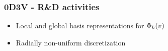 \documentclass[mathserif, aspectratio=169]{beamer}
\newcommand{\of}[1]{\mleft( #1 \mright)}
\begin{document}
\begin{frame}
	\frametitle{0D3V - R\&D activities}
	\begin{itemize}
		\item Local and global basis representations for $\Phi_k\of{v}$
		
		\item Radially non-uniform discretization



\end{itemize}
\end{frame}
\end{document}
